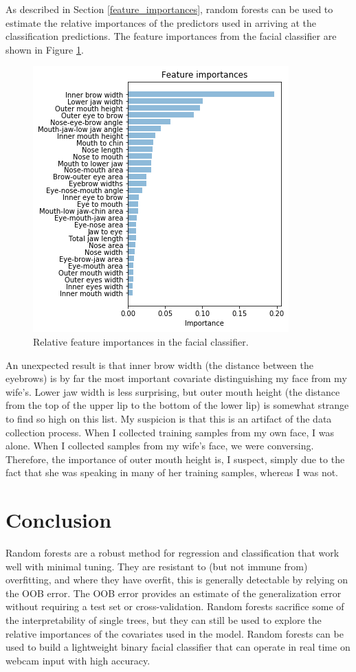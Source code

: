 \documentclass[10pt,a4paper]{article}
\begin{document}
As described in Section \ref{feature_importances}, random forests can be used to estimate the relative importances of the predictors used in arriving at the classification predictions. The feature importances from the facial classifier are shown in Figure \ref{fig:feature_importances}.
\begin{figure}
	\centering
	\includegraphics[width=0.8\linewidth]{feature_importances}
	\caption{Relative feature importances in the facial classifier.}
	\label{fig:feature_importances}
\end{figure}
An unexpected result is that inner brow width (the distance between the eyebrows) is by far the most important covariate distinguishing my face from my wife's. Lower jaw width is less surprising, but outer mouth height (the distance from the top of the upper lip to the bottom of the lower lip) is somewhat strange to find so high on this list. My suspicion is that this is an artifact of the data collection process. When I collected training samples from my own face, I was alone. When I collected samples from my wife's face, we were conversing. Therefore, the importance of outer mouth height is, I suspect, simply due to the fact that she was speaking in many of her training samples, whereas I was not.

\section{Conclusion}
Random forests are a robust method for regression and classification that work well with minimal tuning. They are resistant to (but not immune from) overfitting, and where they have overfit, this is generally detectable by relying on the OOB error. The OOB error provides an estimate of the generalization error without requiring a test set or cross-validation. Random forests sacrifice some of the interpretability of single trees, but they can still be used to explore the relative importances of the covariates used in the model. Random forests can be used to build a lightweight binary facial classifier that can operate in real time on webcam input with high accuracy.
\end{document}
